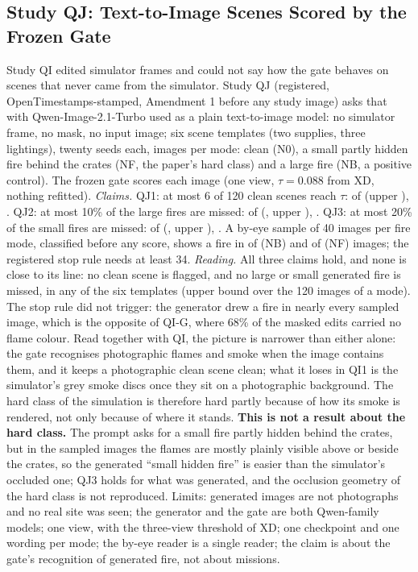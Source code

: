 \subsection{Study QJ: Text-to-Image Scenes Scored by the Frozen Gate}\label{sec:moved-qj}
Study QI edited simulator frames and could not say how the gate behaves on scenes that never came from the simulator. Study QJ (registered, OpenTimestamps-stamped, Amendment 1 before any study image) asks that with Qwen-Image-2.1-Turbo used as a plain text-to-image model: no simulator frame, no mask, no input image; six scene templates (two supplies, three lightings), twenty seeds each, \QJN{} images per mode: clean (N0), a small partly hidden fire behind the crates (NF, the paper's hard class) and a large fire (NB, a positive control). The frozen gate scores each image (one view, $\tau=0.088$ from XD, nothing refitted).
\emph{Claims.} QJ1: at most 6 of 120 clean scenes reach $\tau$: \QJFalse{} of \QJN{} (upper \QJFalseUpper), \QJClaimQJOne. QJ2: at most 10\% of the large fires are missed: \QJLargeMiss{} of \QJLargeN{} (\QJLargeRate, upper \QJLargeUpper), \QJClaimQJTwo. QJ3: at most 20\% of the small fires are missed: \QJSmallMiss{} of \QJSmallN{} (\QJSmallRate, upper \QJSmallUpper), \QJClaimQJThree. A by-eye sample of 40 images per fire mode, classified before any score, shows a fire in \QJLargeSeen{} of \QJLargeSample{} (NB) and \QJSmallSeen{} of \QJSmallSample{} (NF) images; the registered stop rule needs at least 34.
\emph{Reading.} All three claims hold, and none is close to its line: no clean scene is flagged, and no large or small generated fire is missed, in any of the six templates (upper bound \QJLargeUpper{} over the 120 images of a mode). The stop rule did not trigger: the generator drew a fire in nearly every sampled image, which is the opposite of QI-G, where 68\% of the masked edits carried no flame colour. Read together with QI, the picture is narrower than either alone: the gate recognises photographic flames and smoke when the image contains them, and it keeps a photographic clean scene clean; what it loses in QI1 is the simulator's grey smoke discs once they sit on a photographic background. The hard class of the simulation is therefore hard partly because of how its smoke is rendered, not only because of where it stands. \textbf{This is not a result about the hard class.} The prompt asks for a small fire partly hidden behind the crates, but in the sampled images the flames are mostly plainly visible above or beside the crates, so the generated ``small hidden fire'' is easier than the simulator's occluded one; QJ3 holds for what was generated, and the occlusion geometry of the hard class is not reproduced. Limits: generated images are not photographs and no real site was seen; the generator and the gate are both Qwen-family models; one view, with the three-view threshold of XD; one checkpoint and one wording per mode; the by-eye reader is a single reader; the claim is about the gate's recognition of generated fire, not about missions.

